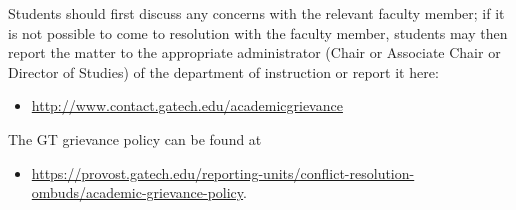 Students should first discuss any concerns with the relevant faculty member; if it is not possible to come to resolution with the faculty member, students may then report the matter to the appropriate administrator (Chair or Associate Chair or Director of Studies) of the department of instruction or report it here: 
        \begin{itemize}
            \item \url{http://www.contact.gatech.edu/academicgrievance}
        \end{itemize} 
    The GT grievance policy can be found at 
        \begin{itemize}
            \item \url{https://provost.gatech.edu/reporting-units/conflict-resolution-ombuds/academic-grievance-policy}. 
        \end{itemize} 
    
